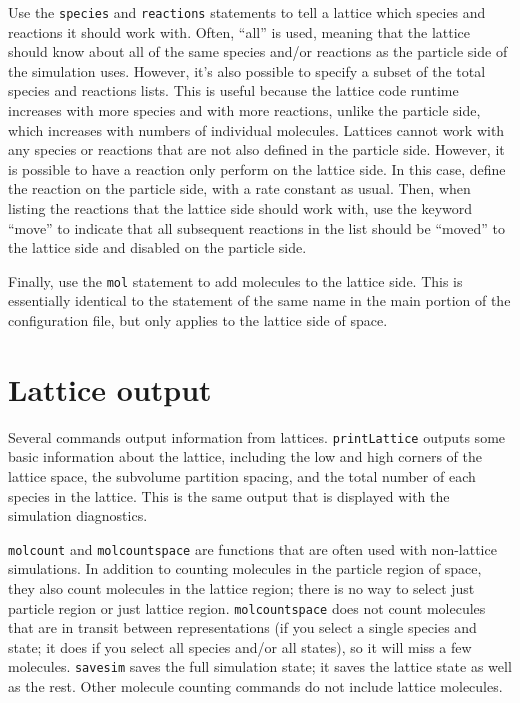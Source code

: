 \documentclass {scrbook}
\newcommand {\ttt} {\texttt}
\begin{document}
Use the \ttt{species} and \ttt{reactions} statements to tell a lattice which species and reactions it should work with. Often, ``all'' is used, meaning that the lattice should know about all of the same species and/or reactions as the particle side of the simulation uses. However, it's also possible to specify a subset of the total species and reactions lists. This is useful because the lattice code runtime increases with more species and with more reactions, unlike the particle side, which increases with numbers of individual molecules. Lattices cannot work with any species or reactions that are not also defined in the particle side. However, it is possible to have a reaction only perform on the lattice side. In this case, define the reaction on the particle side, with a rate constant as usual. Then, when listing the reactions that the lattice side should work with, use the keyword ``move'' to indicate that all subsequent reactions in the list should be ``moved'' to the lattice side and disabled on the particle side.

Finally, use the \ttt{mol} statement to add molecules to the lattice side. This is essentially identical to the statement of the same name in the main portion of the configuration file, but only applies to the lattice side of space.

\section{Lattice output}

Several commands output information from lattices. \ttt{printLattice} outputs some basic information about the lattice, including the low and high corners of the lattice space, the subvolume partition spacing, and the total number of each species in the lattice. This is the same output that is displayed with the simulation diagnostics.

\ttt{molcount} and \ttt{molcountspace} are functions that are often used with non-lattice simulations. In addition to counting molecules in the particle region of space, they also count molecules in the lattice region; there is no way to select just particle region or just lattice region. \ttt{molcountspace} does not count molecules that are in transit between representations (if you select a single species and state; it does if you select all species and/or all states), so it will miss a few molecules. \ttt{savesim} saves the full simulation state; it saves the lattice state as well as the rest. Other molecule counting commands do not include lattice molecules.
\end{document}
